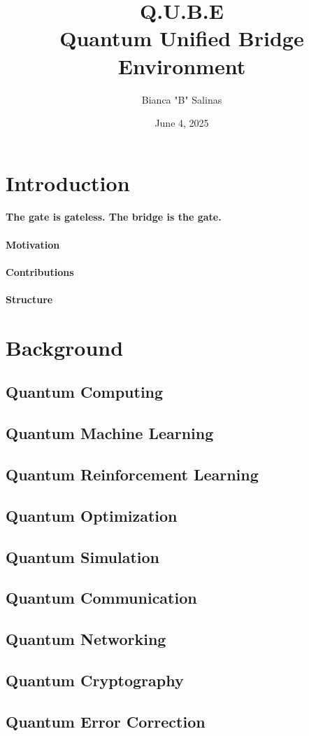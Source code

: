 \documentclass{article}
\title{%
  Q.U.B.E \\
  \Large Quantum Unified Bridge Environment}
\author{Bianca "B" Salinas}
\date{June 4, 2025}
\begin{document}
\maketitle

\section{Introduction}
\paragraph{The gate is gateless. The bridge is the gate.}

\paragraph{Motivation}

\paragraph{Contributions}

\paragraph{Structure}

\section{Background}
\subsection{Quantum Computing}
\subsection{Quantum Machine Learning}
\subsection{Quantum Reinforcement Learning}
\subsection{Quantum Optimization}
\subsection{Quantum Simulation}
\subsection{Quantum Communication}
\subsection{Quantum Networking}
\subsection{Quantum Cryptography}
\subsection{Quantum Error Correction}
\end{document}
